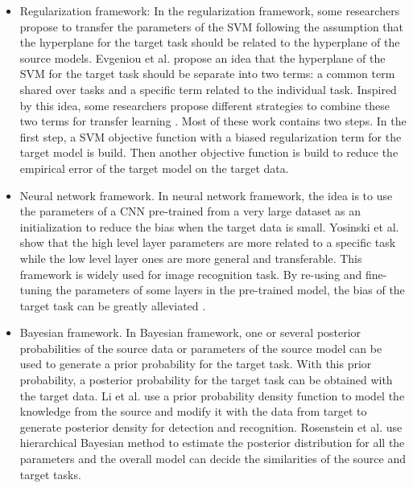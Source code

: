 \begin{itemize}
	\item Regularization framework: In the regularization framework, some researchers propose to transfer the parameters of the SVM following the assumption that the hyperplane for the target task should be related to the hyperplane of the source models. Evgeniou et al. \cite{evgeniou2004regularized} propose an idea that the hyperplane of the SVM for the target task should be separate into two terms: a common term shared over tasks and a specific term related to the individual task. Inspired by this idea, some researchers propose different strategies to combine these two terms for transfer learning \cite{aytar2011tabula} \cite{tommasi2010safety} \cite{yang2007cross}. Most of these work contains two steps. In the first step, a SVM objective function with a biased regularization term for the target model is build. Then another objective function is build to reduce the empirical error of the target model on the target data.
	\item Neural network framework. In neural network framework, the idea is to use the parameters of a CNN pre-trained from a very large dataset as an initialization to reduce the bias when the target data is small. Yosinski et al. \cite{yosinski2014transferable} show that the high level layer parameters are more related to a specific task while the low level layer ones are more general and transferable. This framework is widely used for image recognition task. By re-using and fine-tuning the parameters of some layers in the pre-trained model, the bias of the target task can be greatly alleviated \cite{Chatfield14} \cite{hoffman2013one}  \cite{zeiler2014visualizing} \cite{NIPS2014_Zhou}. 
	\item Bayesian framework. In Bayesian framework, one or several posterior probabilities of the source data or parameters of the source model can be used to generate a prior probability for the target task. With this prior probability, a posterior probability for the target task can be obtained with the target data.
	Li et al. \cite{fei2006one} use a prior probability density function to model the knowledge from the source and modify it with the data from target to generate posterior density for detection and recognition. 
	Rosenstein et al. \cite{rosenstein2005transfer} use hierarchical Bayesian method to estimate the posterior distribution for all the parameters and the overall model can decide the similarities of the source and target tasks. 
\end{itemize}

